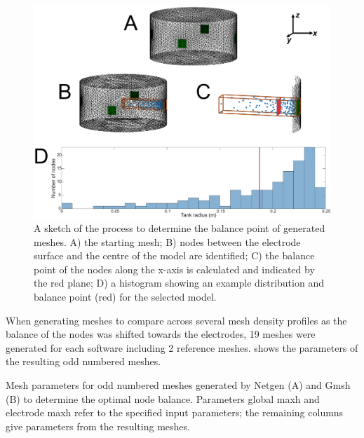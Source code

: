 \begin{figure}[H]
  \includegraphics[width=\columnwidth]{chapter4-mesh_refinement/imgs/balance_methods.pdf}
  \caption[Balance point calculation method]{\label{fig:balanceMethods} A sketch of the process to determine the 
  balance point of generated meshes. A) the starting mesh; B) nodes between the
  electrode surface and the centre of the model are identified; C) the 
  balance point of the nodes along the x-axis is calculated and indicated 
  by the red plane; D) a histogram showing an example distribution and balance point (red)
  for the selected model.}
\end{figure}

When generating meshes to compare across several mesh density profiles as the balance of the nodes was shifted 
towards the electrodes, 19 meshes were generated for each software including 2 reference meshes. 
 shows the parameters of the resulting odd numbered meshes. 

\begin{table}[]
\caption[Parameters used to generate meshes]{\label{tab:mesh-table}Mesh parameters for odd numbered meshes generated by Netgen (A) and Gmsh (B) 
to determine the optimal 
node balance. Parameters global maxh and electrode maxh refer to the specified input parameters; the remaining 
columns give parameters from the resulting meshes.}
\vspace{3mm}
\resizebox{\textwidth}{!}{
}
\end{table}

%
%
%

